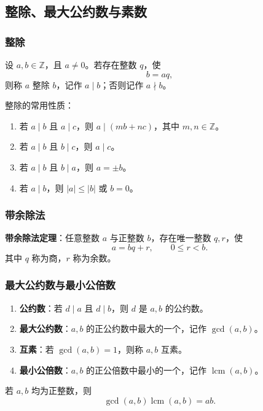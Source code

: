 \subsection{整除、最大公约数与素数}

\subsubsection{整除}

设 \(a,b\in\mathbb Z\)，且 \(a\ne0\)。若存在整数 \(q\)，使
\[
b=aq,
\]
则称 \(a\) 整除 \(b\)，记作 \(a\mid b\)；否则记作 \(a\nmid b\)。

整除的常用性质：
\begin{enumerate}
	\item 若 \(a\mid b\) 且 \(a\mid c\)，则 \(a\mid (mb+nc)\)，其中 \(m,n\in\mathbb Z\)。
	\item 若 \(a\mid b\) 且 \(b\mid c\)，则 \(a\mid c\)。
	\item 若 \(a\mid b\) 且 \(b\mid a\)，则 \(a=\pm b\)。
	\item 若 \(a\mid b\)，则 \(|a|\le |b|\) 或 \(b=0\)。
\end{enumerate}

\subsubsection{带余除法}

\textbf{带余除法定理}：任意整数 \(a\) 与正整数 \(b\)，存在唯一整数 \(q,r\)，使
\[
a=bq+r,\qquad 0\le r<b.
\]
其中 \(q\) 称为商，\(r\) 称为余数。

\subsubsection{最大公约数与最小公倍数}

\begin{enumerate}
	\item \textbf{公约数}：若 \(d\mid a\) 且 \(d\mid b\)，则 \(d\) 是 \(a,b\) 的公约数。
	\item \textbf{最大公约数}：\(a,b\) 的正公约数中最大的一个，记作 \(\gcd(a,b)\)。
	\item \textbf{互素}：若 \(\gcd(a,b)=1\)，则称 \(a,b\) 互素。
	\item \textbf{最小公倍数}：\(a,b\) 的正公倍数中最小的一个，记作 \(\operatorname{lcm}(a,b)\)。
\end{enumerate}

若 \(a,b\) 均为正整数，则
\[
\gcd(a,b)\operatorname{lcm}(a,b)=ab.
\]

